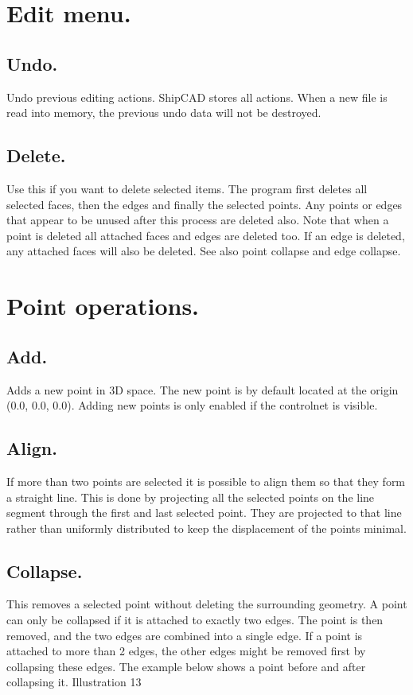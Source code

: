\documentclass[12pt]{article}
\begin{document}
\section{Edit menu.}

\subsection{Undo.}
Undo previous editing actions. ShipCAD stores all actions. When a new file is read into memory,
the previous undo data will not be destroyed.

\subsection{Delete.}
Use this if you want to delete selected items. The program first deletes all selected faces, then the
edges and finally the selected points. Any points or edges that appear to be unused after this
process are deleted also. Note that when a point is deleted all attached faces and edges are
deleted too. If an edge is deleted, any attached faces will also be deleted. See also point collapse
and edge collapse.

\section{Point operations.}

\subsection{Add.}
Adds a new point in 3D space. The new point is by default located at the origin (0.0, 0.0, 0.0).
Adding new points is only enabled if the controlnet is visible.

\subsection{Align.}
If more than two points are selected it is possible to align them so that they form a straight line. This
is done by projecting all the selected points on the line segment through the first and last selected
point. They are projected to that line rather than uniformly distributed to keep the displacement of
the points minimal.

\subsection{Collapse.}
This removes a selected point without deleting the surrounding geometry. A point can only be
collapsed if it is attached to exactly two edges. The point is then removed, and the two edges are
combined into a single edge. If a point is attached to more than 2 edges, the other edges might be
removed first by collapsing these edges. The example below shows a point before and after
collapsing it.
Illustration 13
\end{document}
